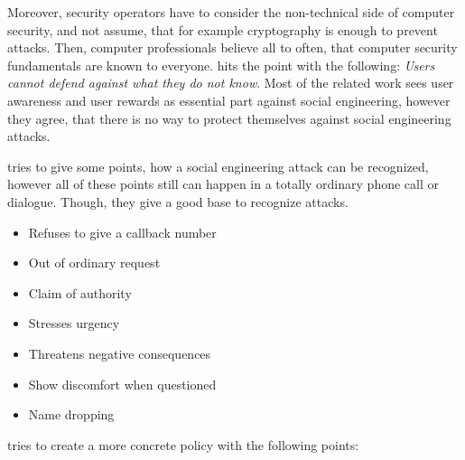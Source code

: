 Moreover, security operators have to consider the non-technical side of
computer security, and not assume, that for example cryptography is enough to
prevent attacks. Then, computer professionals believe all to often, that
computer security fundamentals are known to everyone. \cite{lively2003} hits
the point with the following: \textit{\glqq{}Users cannot defend against what
they do not know\grqq{}}. Most of the related work sees user awareness and user
rewards as essential part against social engineering, however they agree, that
there is no way to protect themselves against social engineering attacks.

\cite{mitnick2003} tries to give some points, how a social engineering attack
can be recognized, however all of these points still can happen in a totally
ordinary phone call or dialogue. Though, they give a good base to recognize
attacks.

\begin{itemize}
  \item Refuses to give a callback number
  \item Out of ordinary request
  \item Claim of authority
  \item Stresses urgency
  \item Threatens negative consequences
  \item Show discomfort when questioned
  \item Name dropping
\end{itemize}

\cite{winkler1995} tries to create a more concrete policy with the following
points:

